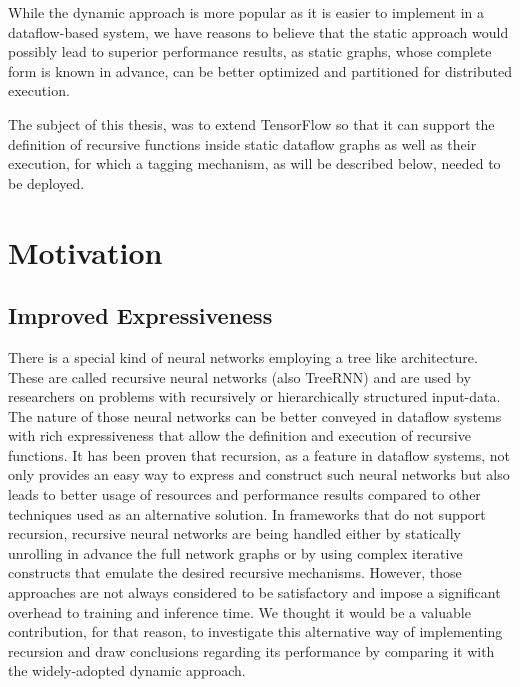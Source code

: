 \documentclass[ack,preface]{dithesis}
\begin{document}
While the dynamic approach is more popular as it is easier to implement in a dataflow-based system,  we have reasons to believe that the static approach would possibly lead to superior performance results, as static graphs, whose complete form is known in advance, can  be better optimized and partitioned  for distributed execution.

The subject of this thesis, was to extend TensorFlow so that it can support the definition of recursive functions inside static dataflow graphs as well as their execution, for which a tagging mechanism, as will be described below, needed to be deployed.


    \section{Motivation}

    \subsection{Improved Expressiveness}
	
	There is a special kind of neural networks employing a tree like architecture. These are called recursive neural networks (also TreeRNN) and are used by researchers on problems with recursively or hierarchically structured input-data. The nature of those neural networks can be better conveyed in dataflow systems with rich expressiveness that allow the definition and execution of recursive functions. It has been proven \cite{Jeong:2018} that recursion, as a feature in dataflow systems, not only provides an easy way to express and construct such neural networks but also leads to better usage of resources and performance results compared to other techniques used as an alternative solution. In frameworks that do not support recursion, recursive neural networks are being handled either by statically unrolling in advance the full network graphs  or by using complex iterative constructs that emulate the desired recursive mechanisms. However, those approaches are not always considered to be satisfactory and impose a significant overhead to training and inference time. 
We thought it would be a valuable contribution, for that reason, to investigate this alternative way of implementing recursion and draw conclusions regarding its performance by comparing it with the widely-adopted dynamic approach.
\end{document}
